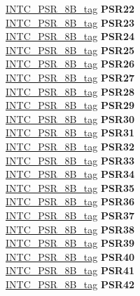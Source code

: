 \begin{DoxyCompactItemize}
\begin{tabbing}
\>\>\mbox{\hyperlink{unionINTC__PSR__8B__tag}{INTC\_PSR\_8B\_tag}} {\bfseries PSR22}\\
\>\>\mbox{\hyperlink{unionINTC__PSR__8B__tag}{INTC\_PSR\_8B\_tag}} {\bfseries PSR23}\\
\>\>\mbox{\hyperlink{unionINTC__PSR__8B__tag}{INTC\_PSR\_8B\_tag}} {\bfseries PSR24}\\
\>\>\mbox{\hyperlink{unionINTC__PSR__8B__tag}{INTC\_PSR\_8B\_tag}} {\bfseries PSR25}\\
\>\>\mbox{\hyperlink{unionINTC__PSR__8B__tag}{INTC\_PSR\_8B\_tag}} {\bfseries PSR26}\\
\>\>\mbox{\hyperlink{unionINTC__PSR__8B__tag}{INTC\_PSR\_8B\_tag}} {\bfseries PSR27}\\
\>\>\mbox{\hyperlink{unionINTC__PSR__8B__tag}{INTC\_PSR\_8B\_tag}} {\bfseries PSR28}\\
\>\>\mbox{\hyperlink{unionINTC__PSR__8B__tag}{INTC\_PSR\_8B\_tag}} {\bfseries PSR29}\\
\>\>\mbox{\hyperlink{unionINTC__PSR__8B__tag}{INTC\_PSR\_8B\_tag}} {\bfseries PSR30}\\
\>\>\mbox{\hyperlink{unionINTC__PSR__8B__tag}{INTC\_PSR\_8B\_tag}} {\bfseries PSR31}\\
\>\>\mbox{\hyperlink{unionINTC__PSR__8B__tag}{INTC\_PSR\_8B\_tag}} {\bfseries PSR32}\\
\>\>\mbox{\hyperlink{unionINTC__PSR__8B__tag}{INTC\_PSR\_8B\_tag}} {\bfseries PSR33}\\
\>\>\mbox{\hyperlink{unionINTC__PSR__8B__tag}{INTC\_PSR\_8B\_tag}} {\bfseries PSR34}\\
\>\>\mbox{\hyperlink{unionINTC__PSR__8B__tag}{INTC\_PSR\_8B\_tag}} {\bfseries PSR35}\\
\>\>\mbox{\hyperlink{unionINTC__PSR__8B__tag}{INTC\_PSR\_8B\_tag}} {\bfseries PSR36}\\
\>\>\mbox{\hyperlink{unionINTC__PSR__8B__tag}{INTC\_PSR\_8B\_tag}} {\bfseries PSR37}\\
\>\>\mbox{\hyperlink{unionINTC__PSR__8B__tag}{INTC\_PSR\_8B\_tag}} {\bfseries PSR38}\\
\>\>\mbox{\hyperlink{unionINTC__PSR__8B__tag}{INTC\_PSR\_8B\_tag}} {\bfseries PSR39}\\
\>\>\mbox{\hyperlink{unionINTC__PSR__8B__tag}{INTC\_PSR\_8B\_tag}} {\bfseries PSR40}\\
\>\>\mbox{\hyperlink{unionINTC__PSR__8B__tag}{INTC\_PSR\_8B\_tag}} {\bfseries PSR41}\\
\>\>\mbox{\hyperlink{unionINTC__PSR__8B__tag}{INTC\_PSR\_8B\_tag}} {\bfseries PSR42}\\

\end{tabbing}
\end{DoxyCompactItemize}
